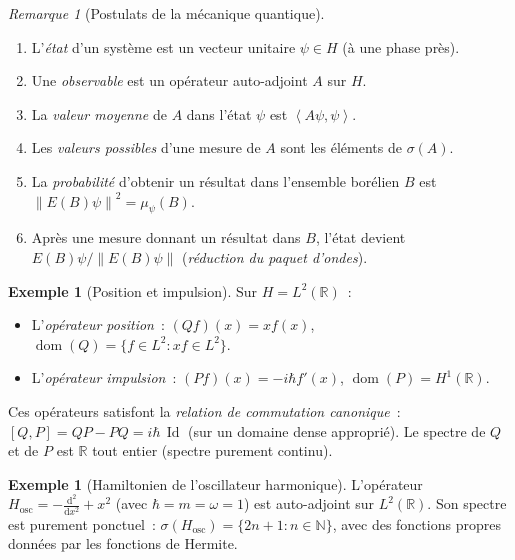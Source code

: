 \documentclass[a4paper,12pt]{book}
\DeclareMathOperator{\Id}{Id}
\DeclareMathOperator{\dom}{dom}
\newcommand{\N}{\mathbb{N}}
\newcommand{\R}{\mathbb{R}}
\newcommand{\dd}{\mathrm{d}}
\newcommand{\norm}[1]{\left\| #1 \right\|}
\newcommand{\inner}[2]{\left\langle #1, #2 \right\rangle}
\theoremstyle{definition}
\newtheorem{exemple}[definition]{Exemple}
\theoremstyle{plain}
\theoremstyle{remark}
\newtheorem{remarque}[definition]{Remarque}
\begin{document}
\begin{remarque}[Postulats de la mécanique quantique]
\begin{enumerate}[label=(\roman*)]
  \item L'\emph{état} d'un système est un vecteur unitaire $\psi \in H$ (à une phase
        près).
  \item Une \emph{observable} est un opérateur auto-adjoint $A$ sur $H$.
  \item La \emph{valeur moyenne} de $A$ dans l'état $\psi$ est
        $\inner{A\psi}{\psi}$.
  \item Les \emph{valeurs possibles} d'une mesure de $A$ sont les éléments de $\sigma(A)$.
  \item La \emph{probabilité} d'obtenir un résultat dans l'ensemble borélien $B$ est
        $\norm{E(B)\psi}^2 = \mu_\psi(B)$.
  \item Après une mesure donnant un résultat dans $B$, l'état devient
        $E(B)\psi / \norm{E(B)\psi}$ (\emph{réduction du paquet d'ondes}).
\end{enumerate}
\end{remarque}

\begin{exemple}[Position et impulsion]
Sur $H = L^2(\R)$~:
\begin{itemize}
  \item L'\emph{opérateur position}~: $(Qf)(x) = xf(x)$, $\dom(Q) = \{f \in L^2 : xf \in L^2\}$.
  \item L'\emph{opérateur impulsion}~: $(Pf)(x) = -i\hbar f'(x)$, $\dom(P) = H^1(\R)$.
\end{itemize}
Ces opérateurs satisfont la \emph{relation de commutation canonique}~:
$[Q, P] = QP - PQ = i\hbar\,\Id$ (sur un domaine dense approprié).
Le spectre de $Q$ et de $P$ est $\R$ tout entier (spectre purement continu).
\end{exemple}

\begin{exemple}[Hamiltonien de l'oscillateur harmonique]
L'opérateur $H_{\mathrm{osc}} = -\frac{\dd^2}{\dd x^2} + x^2$ (avec $\hbar = m = \omega = 1$) est
auto-adjoint sur $L^2(\R)$. Son spectre est purement ponctuel~:
$\sigma(H_{\mathrm{osc}}) = \{2n+1 : n \in \N\}$, avec des fonctions propres données par
les fonctions de Hermite.
\end{exemple}
\end{document}
